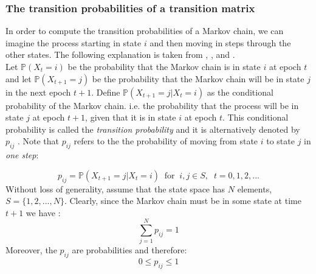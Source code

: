 \documentclass[\main/main.tex]{subfiles}
\begin{document}
\begin{center}
\end{center}







\subsubsection{The transition probabilities of a transition matrix}
In order to compute the transition probabilities of a Markov chain, we can imagine the process starting in state $i$ and then moving in steps through the other states. The following explanation is taken from \cite{Sheskin2010}, \cite{Howard1960}, and \cite{Holmes2015}. \\

Let $\mathds{P}(X_t = i)$ be the probability that the Markov chain is in state $i$ at epoch $t$ and let $\mathds{P}(X_{t+1} = j)$ be the probability that the Markov chain will be in state $j$ in the next epoch $t+1$. Define $\mathds{P}(X_{t+1}
= j|X_{t} = i)$ as the conditional probability of the Markov chain. i.e. the probability that the process will be in state $j$ at epoch $t + 1$, given that it is in state $i$ at epoch $t$. 
This conditional probability is called the \textit{transition probability} and it is alternatively denoted by $p_{ij}$ \citep{Sheskin2010}. Note that $p_{ij}$  refers to the the probability of moving from state $i$ to state $j$ in \textit{one step}:

\begin{equation}
    p_{ij} = \mathds{P}(X_{t+1} = j |X_t = i) \; \; \text{for}\; \; i,j \in S, \; \; t=0,1,2,...
\end{equation}
Without loss of generality, assume that the state space has $N$ elements, $S=\{1,2,...,N\} $. Clearly, since the Markov chain must be in some state at time $t+1$ we have \citep{Howard1960}:
\begin{equation}
 \sum_{j=1}^N     p_{ij} = 1
\end{equation}
 Moreover, the $p_{ij}$ are probabilities and therefore:
\begin{equation}
 0 \leq p_{ij} \leq 1
\end{equation}\\
\end{document}

